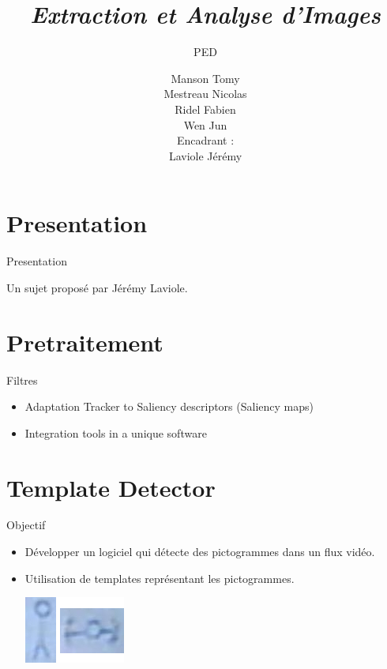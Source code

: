 \documentclass[t,14pt]{beamer}
\title{\textbf{\textit{Extraction et Analyse d'Images}}}
\subtitle{PED}
\author{\scriptsize{Manson Tomy\\
		Mestreau Nicolas\\
		Ridel Fabien\\
		Wen Jun\\
		\vspace{10mm}
		Encadrant : \\
		Laviole Jérémy\\
		}}
\institute{\tiny Université de Bordeaux 1}
\begin{document}
\frame{\titlepage}

\section[Presentation]{Presentation}

\begin{frame}{Presentation}
\begin{center}
Un sujet proposé par Jérémy Laviole.
\vspace{2mm}
\end{center}
\end {frame}

\section[Pré-traitement]{Pretraitement}
\vspace{5mm}
\begin{frame}{Filtres}
\vspace{5mm}
\begin{itemize}[<+->]
\item Adaptation Tracker to Saliency descriptors (Saliency maps)
\item Integration tools in a unique software
\end{itemize}
\end{frame}

\section[Détection de Pictogrammes]{Template Detector}
\begin{frame}{Objectif}
\vspace{5mm}
\begin{itemize}
\item Développer un logiciel qui détecte des pictogrammes dans un flux vidéo.
\item Utilisation de templates représentant les pictogrammes.
\vspace{5mm}
\begin{center}
\includegraphics[scale=0.66]{images/templates.png}
\end{center}
\end{itemize}
\end{frame}
\end{document}
